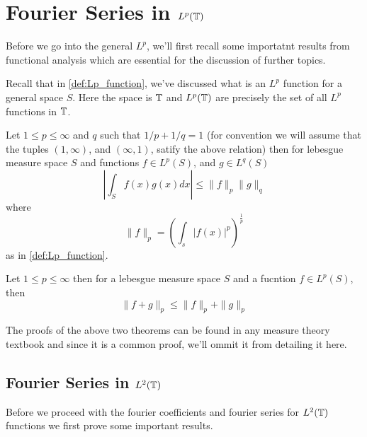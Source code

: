 \chapter{Fourier Series in $L^p(\mathbb T)$}
Before we go into the general $L^p$, we'll first recall some importatnt results from functional analysis which are essential for the discussion of further topics.

Recall that in \autoref{def:Lp_function}, we've discussed what is an $L^p$ function for a general space $S$. Here the space is $\mathbb T$ and $L^p(\mathbb T)$ are precisely the set of all $L^p$ functions in $\mathbb T$.

\begin{theorem}
   \label{thm:Holder_inequality}
  Let $1 \le  p \le \infty$ and $q$ such that $1/p + 1/q = 1$ (for convention we will assume that the tuples $(1, \infty)$, and $(\infty, 1)$, satify the above relation) then for lebesgue measure space $S$ and functions $f \in L^p(S)$, and $g \in L^q(S)$
  $$ \left| \int_S f(x)g(x) dx \right| \le \|f\|_p \|g\|_q$$
  where $$\|f\|_p = \left(\int_s |f(x)|^p \right)^{\frac{1}{p}}$$ as in \autoref{def:Lp_function}.
\end{theorem}

\begin{theorem}
  \label{thm:Minkowski_inequality}
  Let $1 \le p \le \infty$ then for a lebesgue measure space $S$ and a fucntion $f \in L^p(S)$, then 
  $$\|f+g\|_p \le \|f\|_p + \|g\|_p$$
\end{theorem}

The proofs of the above two theorems can be found in any measure theory textbook and since it is a common proof, we'll ommit it from detailing it here.

\section{Fourier Series in $L^2(\mathbb T)$}
Before we proceed with the fourier coefficients and fourier series for $L^2(\mathbb T)$ functions we first prove some important results.

